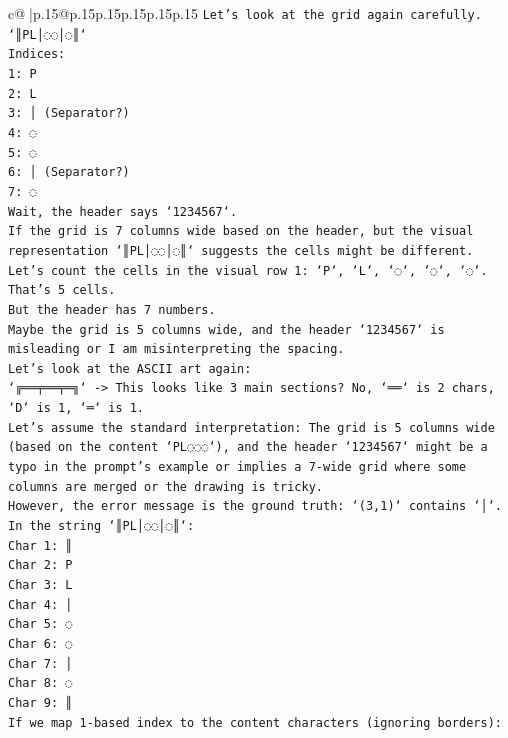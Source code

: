 \documentclass{article}
\begin{document}
{\begin{supertabular}{c@{$\;$}|p{.15\linewidth}@{}p{.15\linewidth}p{.15\linewidth}p{.15\linewidth}p{.15\linewidth}p{.15\linewidth}}
{{{\texttt{Let's look at the grid again carefully.} \\
\texttt{`║PL│◌◌│◌║`} \\
\texttt{Indices:} \\
\texttt{1: P} \\
\texttt{2: L} \\
\texttt{3: │ (Separator?)} \\
\texttt{4: ◌} \\
\texttt{5: ◌} \\
\texttt{6: │ (Separator?)} \\
\texttt{7: ◌} \\
\texttt{Wait, the header says `1234567`.} \\
\texttt{If the grid is 7 columns wide based on the header, but the visual representation `║PL│◌◌│◌║` suggests the cells might be different.} \\
\texttt{Let's count the cells in the visual row 1: `P`, `L`, `◌`, `◌`, `◌`. That's 5 cells.} \\
\texttt{But the header has 7 numbers.} \\
\texttt{Maybe the grid is 5 columns wide, and the header `1234567` is misleading or I am misinterpreting the spacing.} \\
\texttt{Let's look at the ASCII art again:} \\
\texttt{`╔══╤══╤═╗` {-}> This looks like 3 main sections? No, `══` is 2 chars, `D` is 1, `═` is 1.} \\
\texttt{Let's assume the standard interpretation: The grid is 5 columns wide (based on the content `PL◌◌◌`), and the header `1234567` might be a typo in the prompt's example or implies a 7{-}wide grid where some columns are merged or the drawing is tricky.} \\
\texttt{However, the error message is the ground truth: `(3,1)` contains `│`.} \\
\texttt{In the string `║PL│◌◌│◌║`:} \\
\texttt{Char 1: ║} \\
\texttt{Char 2: P} \\
\texttt{Char 3: L} \\
\texttt{Char 4: │} \\
\texttt{Char 5: ◌} \\
\texttt{Char 6: ◌} \\
\texttt{Char 7: │} \\
\texttt{Char 8: ◌} \\
\texttt{Char 9: ║} \\
\texttt{If we map 1{-}based index to the content characters (ignoring borders):} \\
}}}
\end{supertabular}}
\end{document}
